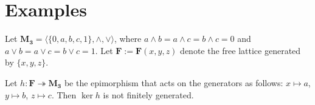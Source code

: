 \newpage
\section{Examples}

Let $\mathbf{M_3} = \langle \{0, a, b, c, 1\}, \wedge, \vee\rangle$, where $a \wedge b = a \wedge c = b \wedge c = 0$ and $a \vee b = a \vee c = b \vee c = 1.$ Let $\mathbf F := \mathbf F(x, y, z)$ denote the free lattice generated by $\{x, y, z\}$.

\begin{proposition}
Let $h\colon \mathbf{F} \twoheadrightarrow \mathbf{M_3}$ be the epimorphism that acts on the generators as follows: $x\mapsto a$, $y\mapsto b$, $z\mapsto c.$ Then $\operatorname{ker} h$ is not finitely generated.
\end{proposition}
